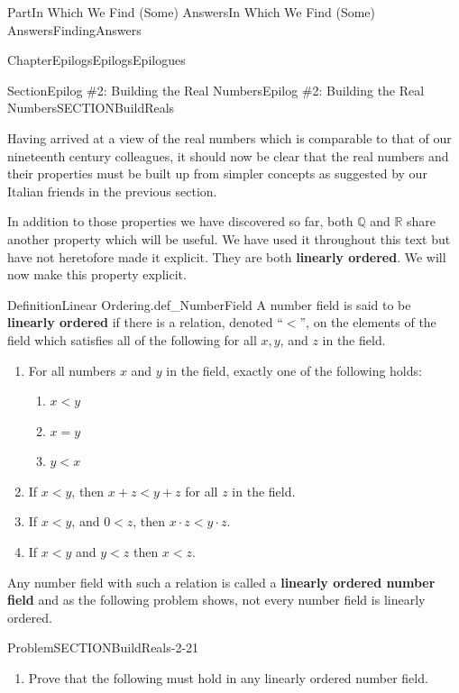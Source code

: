 \documentclass[oneside,10pt,]{book}
\newcommand{\terminology}[1]{\textbf{#1}}
\numberwithin{equation}{part}
\newcommand{\RR}{\mathbb {R}}
\newcommand{\QQ}{\mathbb {Q}}
\newcommand{\lt}{<}
\begin{document}
\begin{partptx}{Part}{In Which We Find (Some) Answers}{}{In Which We Find (Some) Answers}{}{}{FindingAnswers}
\begin{chapterptx}{Chapter}{Epilogs}{}{Epilogs}{}{}{Epilogues}
\begin{sectionptx}{Section}{Epilog \#2: Building the Real Numbers}{}{Epilog \#2: Building the Real Numbers}{}{}{SECTIONBuildReals}
\begin{introduction}{}
Having arrived at a view of the real numbers which is comparable to that of our nineteenth century colleagues, it should now be clear that the real numbers and their properties must be built up from simpler concepts as suggested by our Italian friends in the previous section.%
\par
In addition to those properties we have discovered so far, both \(\QQ\) and \(\RR\) share another property which will be useful. We have used it throughout this text but have not heretofore made it explicit. They are both \terminology{linearly ordered}. We will now make this property explicit.%
\begin{definition}{Definition}{Linear Ordering.}{def_NumberField}%
%
%
%
A number field is said to be \terminology{linearly ordered} if there is a relation, denoted ``\(\lt \)'', on the elements of the field which satisfies all of the following for all \(x, y\), and \(z\) in the field.%
\par
%
\begin{enumerate}
\item{}For all numbers \(x\) and \(y\) in the field, exactly one of the following holds:%
\par
%
\begin{enumerate}
\item{}\(\displaystyle x\lt y\)%
\item{}\(\displaystyle x=y\)%
\item{}\(\displaystyle y\lt x\)%
\end{enumerate}
%
\item{}If \(x\lt y\), then \(x+z\lt y+z\) for all \(z\) in the field.%
\item{}If \(x\lt y\), and \(0\lt z\), then \(x\cdot z \lt y\cdot z\).%
\item{}If \(x\lt y\) and \(y\lt z\) then \(x\lt z\).%
\end{enumerate}
%
\end{definition}
Any number field with such a relation is called a \terminology{linearly ordered number field} and as the following problem shows, not every number field is linearly ordered.%
\begin{problem}{Problem}{}{SECTIONBuildReals-2-21}%
\begin{enumerate}[font=\bfseries,label=(\alph*),ref=\alph*]%
\item{}Prove that the following must hold in any linearly ordered number field.%
\par

\end{enumerate}
\end{problem}
\end{introduction}
\end{sectionptx}
\end{chapterptx}
\end{partptx}
\end{document}
